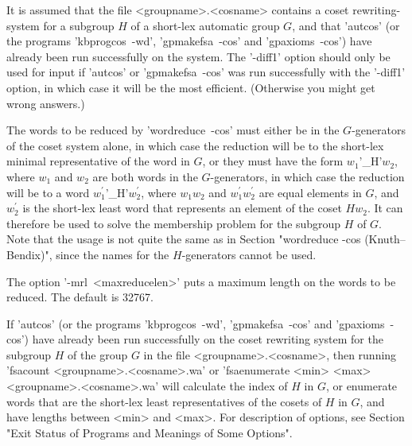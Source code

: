 It is assumed that the file <groupname>.<cosname> contains a coset
rewriting-system for a subgroup $H$ of a short-lex automatic group $G$,
and that 'autcos' (or the programs 'kbprogcos\ -wd', 'gpmakefsa\ -cos'
and 'gpaxioms\ -cos') have already been run successfully on the system.
The '-diff1' option should only be used for input if  'autcos' or
'gpmakefsa\ -cos' was run successfully with the '-diff1' option, in which
case it will be the most efficient. (Otherwise you might get wrong answers.)

The words to be reduced by 'wordreduce\ -cos' must either be in the
$G$-generators of the coset system alone, in which case the reduction
will be to the short-lex minimal representative of the word in $G$, or
they must have the form $w_1$'\_H'$w_2$, where $w_1$ and $w_2$ are both words
in the $G$-generators, in which case the reduction will be to a word
$w_1^\prime$'\_H'$w_2^\prime$, where $w_1w_2$ and $w_1^\prime w_2^\prime$ are
equal elements in $G$, and $w_2^\prime$ is the short-lex least word that
represents an element of the coset $Hw_2$.  It can therefore be used to solve
the membership problem for the subgroup $H$ of $G$.
Note that the usage is not quite the same as in Section
"wordreduce -cos (Knuth--Bendix)", since the names for the $H$-generators
cannot be used.

The option '-mrl\ <maxreducelen>' puts a maximum length on the words to
be reduced. The default is 32767.


If 'autcos' (or the programs 'kbprogcos\ -wd', 'gpmakefsa\ -cos'
and 'gpaxioms\ -cos') have already been run successfully on the 
coset rewriting system for the subgroup $H$ of the group $G$
in the file <groupname>.<cosname>, then running
'fsacount <groupname>.<cosname>.wa'
or 'fsaenumerate <min> <max> <groupname>.<cosname>.wa'
will calculate the index of $H$ in $G$, or enumerate words that are the
short-lex least representatives of the cosets of $H$ in $G$, and
have lengths between <min> and <max>.
For description of options, see Section
"Exit Status of Programs and Meanings of Some Options".


